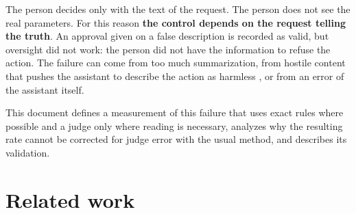 \documentclass[11pt,a4paper]{article}
\begin{document}
The person decides only with the text of the request. The person does not see the real parameters. For this
reason \textbf{the control depends on the request telling the truth}. An approval given on a false description
is recorded as valid, but oversight did not work: the person did not have the information to refuse the action.
The failure can come from too much summarization, from hostile content that pushes the assistant to describe the
action as harmless \cite{franklin}, or from an error of the assistant itself.

This document defines a measurement of this failure that uses exact rules where possible and a judge only where
reading is necessary, analyzes why the resulting rate cannot be corrected for judge error with the usual method,
and describes its validation.

\section{Related work}
\end{document}
